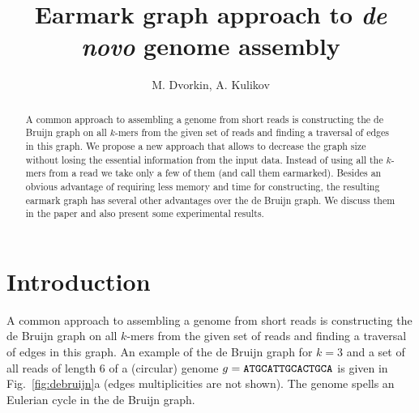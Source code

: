 \documentclass[12pt]{article}
\begin{document}
\author{M. Dvorkin, A. Kulikov}
\title{Earmark graph approach to {\it de novo} genome assembly}
\maketitle

\begin{abstract}
A common approach to assembling a genome from short reads is constructing
the de Bruijn graph on all $k$-mers from the given set of reads and finding a traversal of edges
in this graph. We propose a new approach that allows to decrease
the graph size without losing the essential information from the input data.
Instead of using all the $k$-mers from a read we take only a few of them
(and call them earmarked). Besides an obvious advantage of requiring less memory 
and time for constructing, the resulting earmark graph has several other advantages over the
de Bruijn graph. We discuss them in the paper and also present some experimental results.
\end{abstract}

\tableofcontents


\section{Introduction}
A common approach to assembling a genome from short reads is constructing
the de Bruijn graph \cite{PW01} on all $k$-mers from the given set of 
reads and finding a traversal of edges in this graph.{}
An example of the de Bruijn graph for $k=3$ and a set of all reads of length $6$
of a (circular) genome $g={\tt ATGCATTGCACTGCA}$ is given in Fig.~\ref{fig:debruijn}a
(edges multiplicities are not shown). The genome spells an Eulerian
cycle in the de Bruijn graph.
\end{document}
